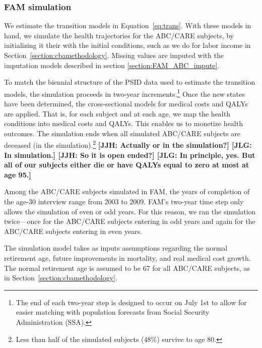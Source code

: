 


\subsubsection{FAM simulation}
\label{appendix:health-fam-simulation}

\noindent We estimate the transition models in Equation~\eqref{eq:trans}. With these models in hand, we simulate the health trajectories for the ABC/CARE subjects, by initializing it their with the initial conditions, such as we do for labor income in Section~\ref{section:cbamethodology}. Missing values are imputed with the imputation models described in section \ref{section:FAM_ABC_impute}.

\noindent To match the biennial structure of the PSID data used to estimate the transition models, the simulation proceeds in two-year increments.\footnote{The end of each two-year step is designed to occur on July 1st to allow for easier matching with population forecasts from Social Security Administration (SSA).}
Once the new states have been determined, the cross-sectional models for medical costs and QALYs are applied. That is, for each subject and at each age, we map the health conditions into medical costs and QALYs. This enables us to monetize health outcomes. The simulation ends when all simulated ABC/CARE subjects are deceased (in the simulation).\footnote{Less than half of the simulated subjects (48\%) survive to age 80.} \textbf{[JJH: Actually or in the simulation?] [JLG: In simulation.] [JJH: So it is open ended?] [JLG: In principle, yes. But all of our subjects either die or have QALYs equal to zero at most at age 95.]}

\noindent Among the ABC/CARE subjects simulated in FAM, the years of completion of the age-30 interview range from 2003 to 2009. FAM's two-year time step only allows the simulation of even or odd years. For this reason, we ran the simulation twice---once for the ABC/CARE subjects entering in odd years and again for the ABC/CARE subjects entering in even years.

\noindent The simulation model takes as inputs assumptions regarding the normal retirement age, future improvements in mortality, and real medical cost growth. The normal retirement age is assumed to be 67 for all ABC/CARE subjects, as in Section~\ref{section:cbamethodology}.

